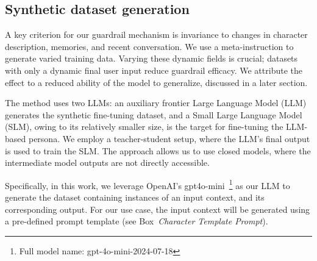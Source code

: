 \documentclass[letterpaper]{article}
\newcommand{\allm}{OpenAI's gpt4o-mini}
\newcommand{\fullallm}{gpt-4o-mini-2024-07-18} %
\begin{document}
\subsection{Synthetic dataset generation}
A key criterion for our guardrail mechanism is invariance to changes in character description, memories, and recent conversation. We use a meta-instruction to generate varied training data. Varying these dynamic fields is crucial; datasets with only a dynamic final user input reduce guardrail efficacy. We attribute the effect to a reduced ability of the model to generalize, discussed in a later section.

The method uses two LLMs: an auxiliary frontier Large Language Model (LLM) generates the synthetic fine-tuning dataset, and a Small Large Language Model (SLM), owing to its relatively smaller size, is the target for fine-tuning the LLM-based persona. We employ a teacher-student setup, where the LLM's final output is used to train the SLM.\@ 
The approach allows us to use closed models, where the intermediate model outputs are not directly accessible.

Specifically, in this work, we leverage \allm~\footnote{Full model name: \fullallm} as our LLM to generate the dataset containing instances of an input context, and its corresponding output. For our use case, the input context will be generated using a pre-defined prompt template (see Box~\textit{Character Template Prompt}).
\end{document}
